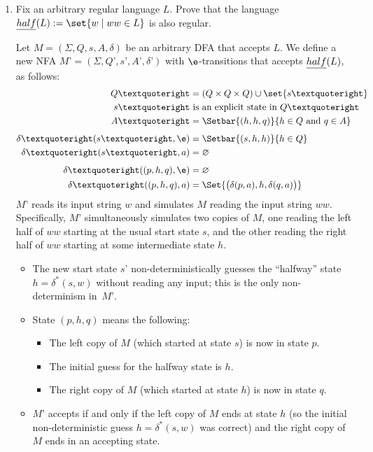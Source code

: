 \documentclass[11pt]{article}
\begin{document}
\begin{enumerate}
\item[4.] 
Fix an arbitrary regular language $L$.  Prove that the language $\emph{half}(L) := \set{w \mid {ww\in L}}$ is also regular.

\begin{Solution}
Let $M = (\Sigma, Q, s, A, \delta)$ be an arbitrary DFA that accepts $L$.  We define a new NFA $M’ = (\Sigma, Q’, s’, A’, \delta’)$ with $\e$-transitions that accepts $\emph{half}(L)$, as follows:
\begin{align*}
	Q’ & = (Q\times Q\times Q) \cup \set{s’} \\
	s’ & \text{~is an explicit state in $Q’$} \\
	A’ &= \Setbar{(h, h, q)}{h\in Q \text{~and~} q\in A}
	\\[1ex]
	\delta’(s’, \e) &= \Setbar{(s, h, h)}{h\in Q} \\
	\delta’(s’, a) &= \varnothing \\[1ex]
	\delta’((p, h, q), \e) &= \varnothing\\
	\delta’((p, h, q), a) &= \Set{\big(\delta(p, a), h, \delta(q, a)\big)}
\end{align*}
$M’$ reads its input string $w$ and simulates $M$ reading the input string $ww$.  Specifically, $M’$ simultaneously simulates two copies of $M$, one reading the left half of $ww$ starting at the usual start state $s$, and the other reading the right half of $ww$ starting at some intermediate state $h$.
\begin{itemize}
\item 
The new start state $s’$ non-deterministically guesses the “halfway” state $h = \delta^*(s, w)$ without reading any input; this is the only non-determinism in~$M’$.
\item
State $(p, h, q)$ means the following:
\begin{itemize}
\item The left copy of $M$ (which started at state $s$) is now in state $p$.
\item The initial guess for the halfway state is $h$.
\item The right copy of $M$ (which started at state $h$) is now in state $q$.
\end{itemize}
\item
$M’$ accepts if and only if the left copy of $M$ ends at state $h$ (so the initial non-deterministic guess $h = \delta^*(s, w)$ was correct) and the right copy of $M$ ends in an accepting state.
\end{itemize}
\unskip
\end{Solution}


\end{enumerate}
\end{document}
